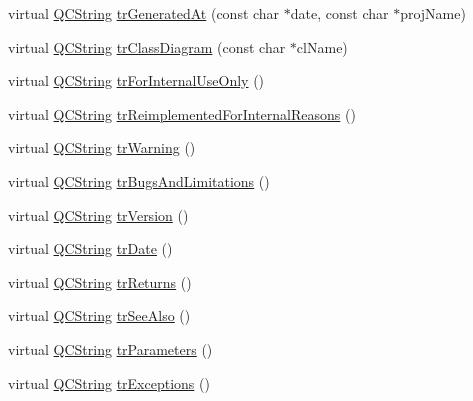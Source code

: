 \begin{DoxyCompactItemize}
\item 
virtual \mbox{\hyperlink{class_q_c_string}{Q\+C\+String}} \mbox{\hyperlink{class_translator_norwegian_adf8ef23ac98bd9415011c87683878ade}{tr\+Generated\+At}} (const char $\ast$date, const char $\ast$proj\+Name)
\item 
virtual \mbox{\hyperlink{class_q_c_string}{Q\+C\+String}} \mbox{\hyperlink{class_translator_norwegian_ac3fdd9c68f86820273ed846947b36a32}{tr\+Class\+Diagram}} (const char $\ast$cl\+Name)
\item 
virtual \mbox{\hyperlink{class_q_c_string}{Q\+C\+String}} \mbox{\hyperlink{class_translator_norwegian_ae24456df4b45e2bd59c72676a8540dd9}{tr\+For\+Internal\+Use\+Only}} ()
\item 
virtual \mbox{\hyperlink{class_q_c_string}{Q\+C\+String}} \mbox{\hyperlink{class_translator_norwegian_ae612ce5aee18c767dbfcece833d81a95}{tr\+Reimplemented\+For\+Internal\+Reasons}} ()
\item 
virtual \mbox{\hyperlink{class_q_c_string}{Q\+C\+String}} \mbox{\hyperlink{class_translator_norwegian_a321a35ac04917c7cfad58c8b07d96c66}{tr\+Warning}} ()
\item 
virtual \mbox{\hyperlink{class_q_c_string}{Q\+C\+String}} \mbox{\hyperlink{class_translator_norwegian_a17a24abd1755843a02c90fb423414769}{tr\+Bugs\+And\+Limitations}} ()
\item 
virtual \mbox{\hyperlink{class_q_c_string}{Q\+C\+String}} \mbox{\hyperlink{class_translator_norwegian_a6204fd86995f2396d07f220646d16880}{tr\+Version}} ()
\item 
virtual \mbox{\hyperlink{class_q_c_string}{Q\+C\+String}} \mbox{\hyperlink{class_translator_norwegian_a5d293c6ae2efe0cfe082d73ebb4806f4}{tr\+Date}} ()
\item 
virtual \mbox{\hyperlink{class_q_c_string}{Q\+C\+String}} \mbox{\hyperlink{class_translator_norwegian_a996a8f2034b0a0e979b5e09edaac9ce2}{tr\+Returns}} ()
\item 
virtual \mbox{\hyperlink{class_q_c_string}{Q\+C\+String}} \mbox{\hyperlink{class_translator_norwegian_ad331eea92a6521513efff980c9a344a2}{tr\+See\+Also}} ()
\item 
virtual \mbox{\hyperlink{class_q_c_string}{Q\+C\+String}} \mbox{\hyperlink{class_translator_norwegian_a6d3b1c8cab7987a61c80ef039cb3e563}{tr\+Parameters}} ()
\item 
virtual \mbox{\hyperlink{class_q_c_string}{Q\+C\+String}} \mbox{\hyperlink{class_translator_norwegian_af7e07ca08e6f39ba175943fca916b7cf}{tr\+Exceptions}} ()
\item 

\end{DoxyCompactItemize}
